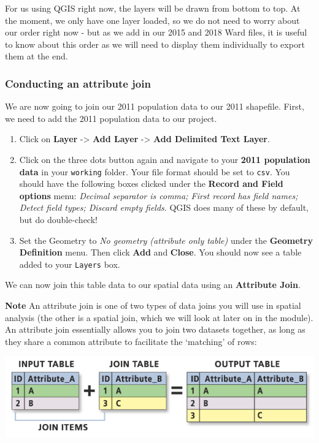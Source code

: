 \documentclass[
]{book}
\begin{document}
For us using QGIS right now, the layers will be drawn from bottom to top. At the moment, we only have one layer loaded, so we do not need to worry about our order right now - but as we add in our 2015 and 2018 Ward files, it is useful to know about this order as we will need to display them individually to export them at the end.

\hypertarget{conducting-an-attribute-join}{%
\subsubsection{Conducting an attribute join}\label{conducting-an-attribute-join}}

We are now going to join our 2011 population data to our 2011 shapefile. First, we need to add the 2011 population data to our project.

\begin{enumerate}
\def\labelenumi{\arabic{enumi}.}
\item
  Click on \textbf{Layer} -\textgreater{} \textbf{Add Layer} -\textgreater{} \textbf{Add Delimited Text Layer}.
\item
  Click on the three dots button again and navigate to your \textbf{2011 population data} in your \texttt{working} folder. Your file format should be set to \texttt{csv}. You should have the following boxes clicked under the \textbf{Record and Field options} menu: \emph{Decimal separator is comma; First record has field names; Detect field types; Discard empty fields}. QGIS does many of these by default, but do double-check!
\item
  Set the Geometry to \emph{No geometry (attribute only table)} under the \textbf{Geometry Definition} menu. Then click \textbf{Add} and \textbf{Close}. You should now see a table added to your \texttt{Layers} box.
\end{enumerate}

We can now join this table data to our spatial data using an \textbf{Attribute Join}.

\textbf{Note}
An attribute join is one of two types of data joins you will use in spatial analysis (the other is a spatial join, which we will look at later on in the module). An attribute join essentially allows you to join two datasets together, as long as they share a common attribute to facilitate the `matching' of rows:

\begin{center}\includegraphics[width=12.08in]{images/w02/attribute_joins} \end{center}
\end{document}
